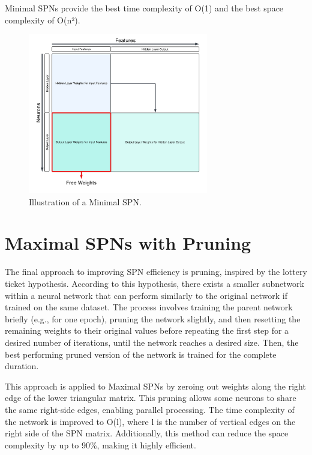 Minimal SPNs provide the best time complexity of O(1) and the best space complexity of O(n²).

\begin{figure}[ht]
\centering
\includegraphics[width=0.7\textwidth]{Figures/Methodology/Minimal_SPN_Weights.png}
\caption{Illustration of a Minimal SPN.}
\label{fig:minSpn}
\end{figure}

\section{Maximal SPNs with Pruning}

The final approach to improving SPN efficiency is pruning, inspired by the lottery ticket hypothesis. According to this hypothesis, there exists a smaller subnetwork within a neural network that can perform similarly to the original network if trained on the same dataset. The process involves training the parent network briefly (e.g., for one epoch), pruning the network slightly, and then resetting the remaining weights to their original values before repeating the first step for a desired number of iterations, until the network reaches a desired size. Then, the best performing pruned version of the network is trained for the complete duration.
 
This approach is applied to Maximal SPNs by zeroing out weights along the right edge of the lower triangular matrix. This pruning allows some neurons to share the same right-side edges, enabling parallel processing. The time complexity of the network is improved to O(l), where l is the number of vertical edges on the right side of the SPN matrix. Additionally, this method can reduce the space complexity by up to 90\%, making it highly efficient.